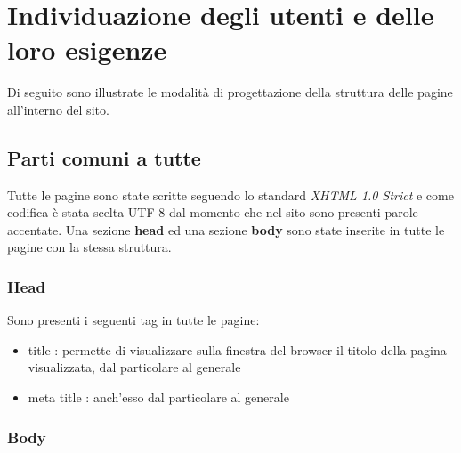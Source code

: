 \section{Individuazione degli utenti e delle loro esigenze}
Di seguito sono illustrate le modalità di progettazione della struttura delle
pagine all'interno del sito.

\subsection{Parti comuni a tutte}
Tutte le pagine sono state scritte seguendo lo standard \textit{XHTML 1.0 Strict} e come codifica è stata scelta UTF-8 dal momento che nel sito sono
presenti parole accentate.
Una sezione \textbf{head} ed una sezione \textbf{body} sono state inserite in
tutte le pagine con la stessa struttura.

\subsubsection{Head}
Sono presenti i seguenti tag in tutte le pagine:
\begin{itemize}
\item title : permette di visualizzare sulla finestra del browser il titolo della pagina visualizzata, dal particolare al generale
\item meta title : anch'esso dal particolare al generale 
\end{itemize}

\subsubsection{Body}

